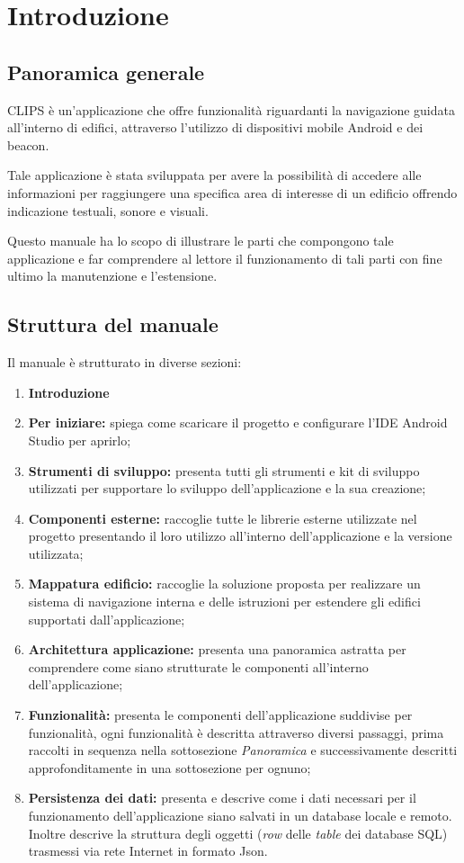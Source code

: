 \documentclass[../ManualeSviluppatore.tex]{subfiles}
\begin{document}
\section{Introduzione}
\label{sec:Introduzione}
	\subsection{Panoramica generale}
	
	CLIPS è un'applicazione che offre funzionalità riguardanti la navigazione guidata all'interno di edifici, attraverso l'utilizzo di dispositivi mobile \gls{Android} e dei \gls{beacon}.
	
	Tale applicazione è stata sviluppata per avere la possibilità di accedere alle informazioni per raggiungere una specifica area di interesse di un edificio offrendo indicazione testuali, sonore e visuali.
	
	Questo manuale ha lo scopo di illustrare le parti che compongono tale applicazione e far comprendere al lettore il funzionamento di tali parti con fine ultimo la manutenzione e l'estensione.
	
	\subsection{Struttura del manuale}
		Il manuale è strutturato in diverse sezioni:
		\begin{enumerate}
			\item \textbf{Introduzione}
			\item \textbf{Per iniziare:} spiega come scaricare il progetto e configurare l'IDE \gls{Android Studio} per aprirlo;
			\item \textbf{Strumenti di sviluppo:} presenta tutti gli strumenti e kit di sviluppo utilizzati per supportare lo sviluppo dell'applicazione e la sua creazione;
			\item \textbf{Componenti esterne:} raccoglie tutte le librerie esterne utilizzate nel progetto presentando il loro utilizzo all'interno dell'applicazione e la versione utilizzata;
			\item \textbf{Mappatura edificio:} raccoglie la soluzione proposta per realizzare un sistema di navigazione interna e delle istruzioni per estendere gli edifici supportati dall'applicazione;
			\item \textbf{Architettura applicazione:} presenta una panoramica astratta per comprendere come siano strutturate le componenti all'interno dell'applicazione;
			\item \textbf{Funzionalità:} presenta le componenti dell'applicazione suddivise per funzionalità, ogni funzionalità è descritta attraverso diversi passaggi, prima raccolti in sequenza nella sottosezione \textit{Panoramica} e successivamente descritti approfonditamente in una sottosezione per ognuno;
			\item \textbf{Persistenza dei dati:} presenta e descrive come i dati necessari per il funzionamento dell'applicazione siano salvati in un database locale e remoto. Inoltre descrive la struttura degli oggetti (\textit{row} delle \textit{table} dei database SQL) trasmessi via rete Internet in formato Json.
			
		\end{enumerate}
		
\end{document}
